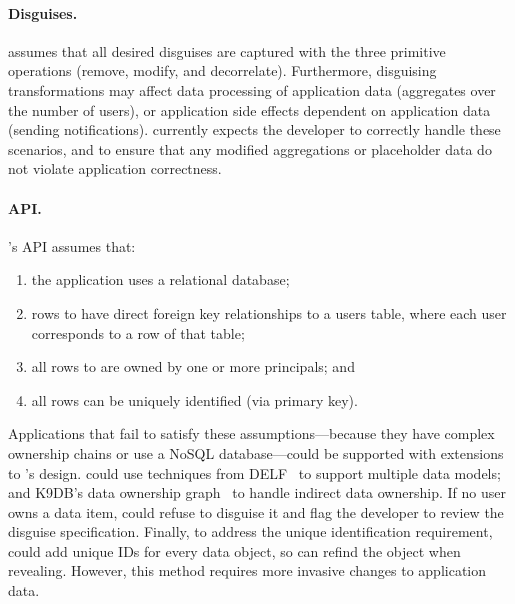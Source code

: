 \paragraph{Disguises.}
\sys assumes that all desired disguises are captured with the three primitive
operations (remove, modify, and decorrelate).
%
Furthermore, disguising transformations may affect data processing of
application data (\eg aggregates over the number of users), or application side
effects dependent on application data (\eg sending notifications).  \sys
currently expects the developer to correctly handle these scenarios, and to ensure
that any modified aggregations or placeholder data do not violate application
correctness.
%

\paragraph{API.}
\sys's API assumes that:
\begin{enumerate}[nosep]
    \item the application uses a relational database;
    \item rows to \xx have direct foreign key relationships to a users table,
    where each user corresponds to a row of that table;
    \item all rows to \xx are owned by one or more principals; and
    \item all rows can be uniquely identified (\eg via primary key).
\end{enumerate}
%
Applications that fail to satisfy these assumptions---\eg because they have
complex ownership chains or use a NoSQL database---could be supported with
extensions to \sys's design. \sys could use techniques from DELF~\cite{delf} to
support multiple data models; 
%
and K9DB's data ownership graph~\cite{k9db} to handle indirect data ownership.
If no user owns a data item, \sys could refuse to disguise it and flag the
developer to review the disguise specification.  
%
Finally, to address the unique identification requirement, \sys could add unique
IDs for every data object, so \sys can refind the object when revealing.
However, this method requires more invasive changes to application data. 
%

